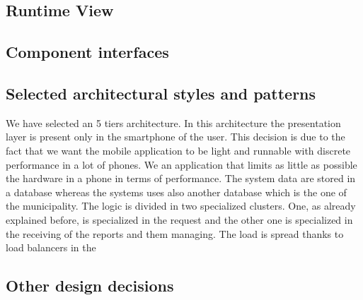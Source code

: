 \documentclass[titlepage]{article}
\begin{document}
\subsection{Runtime View}
\subsection{Component interfaces}
\subsection{Selected architectural styles and patterns}
We have selected an 5 tiers architecture. In this architecture the presentation layer is present only in the smartphone of the user. This decision is due to the fact that we want the mobile application to be light and runnable with discrete performance in a lot of phones. We an application that limits as little as possible the hardware in a phone in terms of performance. The system data are stored in a database  whereas the systems uses also another database which is the one of the municipality.
The logic is divided in two specialized clusters. One, as already explained before, is specialized in the request and the other one is specialized in the receiving of the reports and them managing. The load is spread thanks to load balancers in the 
\subsection{Other design decisions}
\end{document}

